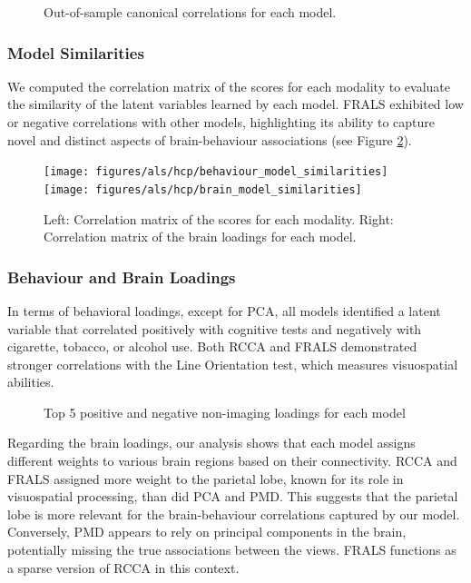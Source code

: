 \begin{figure}[h]
\centering

\caption{Out-of-sample canonical correlations for each model.}
\label{fig:performance}
\end{figure}

\subsubsection{Model Similarities}
We computed the correlation matrix of the scores for each modality to evaluate the similarity of the latent variables learned by each model. FRALS exhibited low or negative correlations with other models, highlighting its ability to capture novel and distinct aspects of brain-behaviour associations (see Figure \ref{fig:similarities}).

\begin{figure}[h]
\centering
\texttt{[image: figures/als/hcp/behaviour\_model\_similarities]}
\texttt{[image: figures/als/hcp/brain\_model\_similarities]}
\caption{Left: Correlation matrix of the scores for each modality. Right: Correlation matrix of the brain loadings for each model.}
\label{fig:similarities}
\end{figure}


\subsubsection{Behaviour and Brain Loadings}
In terms of behavioral loadings, except for PCA, all models identified a latent variable that correlated positively with cognitive tests and negatively with cigarette, tobacco, or alcohol use.
Both RCCA and FRALS demonstrated stronger correlations with the Line Orientation test, which measures visuospatial abilities.

\begin{figure}[h]
\centering

\caption*{Top 5 positive and negative non-imaging loadings for each model}
\label{fig:behaviour}
\end{figure}

Regarding the brain loadings, our analysis shows that each model assigns different weights to various brain regions
based on their connectivity.
RCCA and FRALS assigned more weight to the parietal lobe, known for its role in visuospatial processing, than did PCA and PMD. This suggests that the parietal lobe is more relevant for the brain-behaviour correlations captured by our model.
Conversely, PMD appears to rely on principal components in the brain, potentially missing the true associations between the views.
FRALS functions as a sparse version of RCCA in this context.

